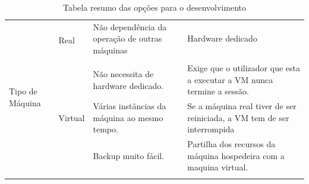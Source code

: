 \begin{longtable}{|p{}|p{}|p{}|p{}|}
	\multirow{5}{*}{Tipo de Máquina}                                        & \multirow{2}{*}{Real}                                 & Não dependência da operação de outras máquinas                      & Hardware dedicado                                                                                   \\
	&                                                       &                                                                     &                                                                                                     \\ \cline{2-4}
	& \multirow{3}{*}{Virtual}                              & Não necessita de hardware dedicado.                                 & Exige que o utilizador que esta a executar a VM nunca termine a sessão.                             \\
	&                                                       & Várias instâncias da máquina ao mesmo tempo.                        & Se a máquina real tiver de ser reiniciada, a VM tem de ser interrompida                             \\
	&                                                       & Backup muito fácil.                                                 & Partilha dos recursos da máquina hospedeira com a maquina virtual.                                  \\
	\hline
	\caption{Tabela resumo das opções para o desenvolvimento}
	\label{tab:opcoes_dev}
\end{longtable}


